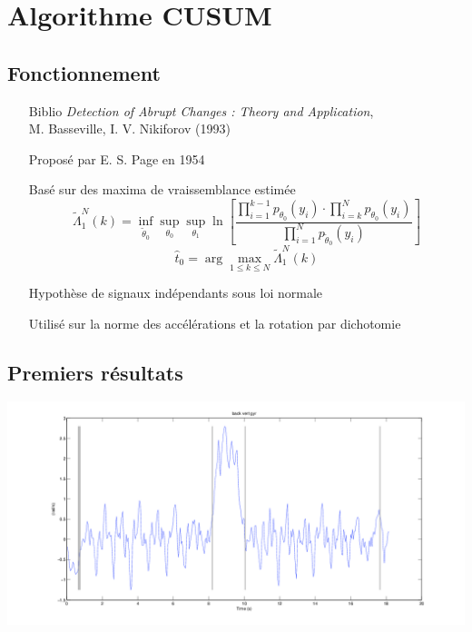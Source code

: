 \documentclass{beamer}
\begin{document}
\section{Algorithme CUSUM}
\subsection{Fonctionnement}

\begin{frame}
\begin{itemize}
\item[Biblio] \emph{Detection of Abrupt Changes : Theory and Application},\\
M. Basseville, I. V. Nikiforov (1993)
\item[Proposé] par E. S. Page en 1954
\item[Basé] sur des maxima de vraissemblance estimée
\[\tilde\varLambda_1^N(k)=\inf_{\tilde\theta_0}\sup_{\theta_0}\sup_{\theta_1}\ln\left[\frac{\prod_{i=1}^{k-1}p_{\theta_0}(y_i)\cdot\prod_{i=k}^Np_{\theta_0}(y_i)}{\prod_{i=1}^Np_{\tilde\theta_0}(y_i)}\right]\]
\[\hat t_0=\arg\max_{1\le k\le N}\tilde\varLambda_1^N(k)\]
\item[Hypothèse] de signaux indépendants sous loi normale
\item[Utilisé] sur la norme des accélérations et la rotation par dichotomie
\end{itemize}
\end{frame}

\subsection{Premiers résultats}

\begin{frame}
\hspace*{-2.8cm}\includegraphics[scale=0.4]{examplecusumbackvertgyr}
\end{frame}
\end{document}
